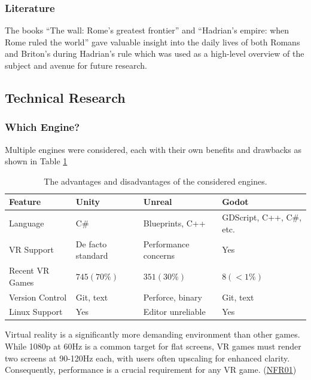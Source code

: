 \documentclass[sigconf]{acmart}
\begin{document}
\subsubsection{Literature}

The books ``The wall: Rome's greatest frontier'' \cite{moffat_wall_2009} and
``Hadrian's empire: when Rome ruled the world'' \cite{danziger_hadrians_2006}
gave valuable insight into the daily lives of both Romans and Briton's during
Hadrian's rule which was used as a high-level overview of the subject and avenue
for future research.

\subsection{Technical Research}

\subsubsection{Which Engine?}

Multiple engines were considered, each with their own benefits
and drawbacks as shown in Table \ref{table:engine_compare}

\begin{table}
  \caption{The advantages and disadvantages of the considered engines.}
  \label{table:engine_compare}
  \begin{tabular}{llll}\toprule
    Feature & Unity & Unreal & Godot \\\midrule

    Language & C\# & Blueprints, C++ & GDScript, C++, C\#, etc. \\
    VR Support & De facto standard & Performance concerns & Yes \\
    Recent VR Games & $745 (70\%)$ & $351 (30\%)$ & $8 (<1\%)$ \\
    Version Control & Git, text & Perforce, binary & Git, text \\
    Linux Support & Yes & Editor unreliable & Yes \\

    \bottomrule
  \end{tabular}
\end{table}

Virtual reality is a significantly more demanding environment than other games.
While 1080p at 60Hz is a common target for flat screens, VR games must render
two screens at 90-120Hz each, with users often upscaling for enhanced clarity.
Consequently, performance is a crucial requirement for any VR game.
(\hyperref[sec:nfr_performance]{NFR01})
\end{document}
